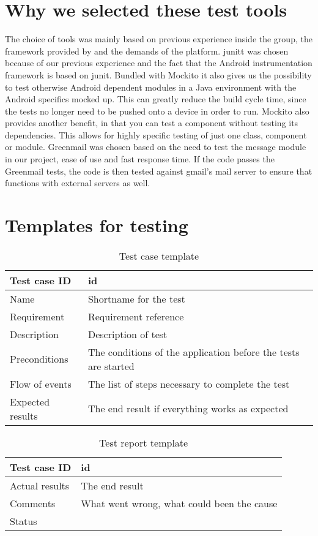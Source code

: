 \section{Why we selected these test tools}
The choice of tools was mainly based on previous experience inside the group, the framework provided by and the demands of the platform. 
\newline
\newline
\gls{junit}t was chosen because of our previous experience and the fact that the Android instrumentation framework is based on \gls{junit}. Bundled with Mockito it also gives us the possibility to test otherwise Android dependent modules in a Java environment with the Android specifics mocked up. This can greatly reduce the build cycle time, since the tests no longer need to be pushed onto a device in order to run. Mockito also provides another benefit, in that you can test a component without testing its dependencies. This allows for highly specific testing of just one class, component or module.
\newline
\newline
Greenmail was chosen based on the need to test the message module in our project, ease of use and fast response time. If the code passes the Greenmail tests, the code is then tested against gmail’s mail server to ensure that functions with external servers as well. 

\section{Templates for testing}
\begin{table}
\begin{tabular}{l|p{10cm}}
Test case ID & id \\ \hline
Name & Shortname for the test\\ \hline
Requirement & Requirement reference\\ \hline
Description & Description of test\\ \hline
Preconditions & The conditions of the application before the tests are started\\ \hline
Flow of events & The list of steps necessary to complete the test \\ \hline
Expected results & The end result if everything works as expected\\ \hline \hline
\end{tabular}
\caption{Test case template} \label{tab:casetemp}
\end{table}
\begin{table}
	\begin{tabular}{l|p{10cm}}
		Test case ID & id \\ \hline
		Actual results & The end result\\ \hline
		Comments & What went wrong, what could been the cause\\ \hline
		Status & 
	\end{tabular}
	\caption{Test report template} \label{tab:casereporttemp}
\end{table}